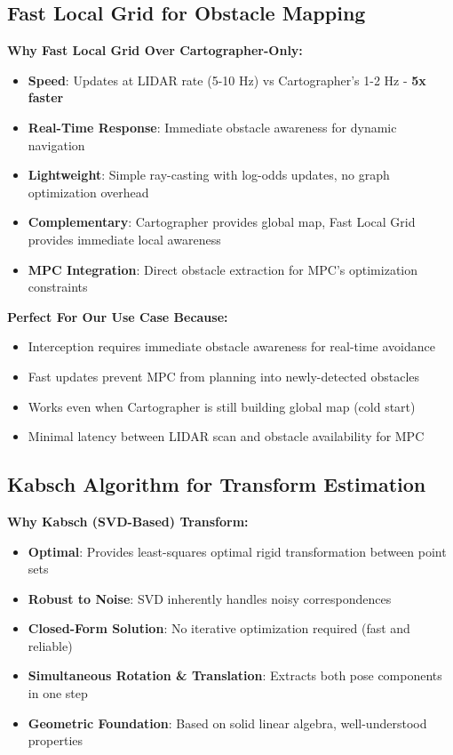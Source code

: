 \documentclass[11pt]{article}
\begin{document}
\subsection{Fast Local Grid for Obstacle Mapping}

\textbf{Why Fast Local Grid Over Cartographer-Only:}

\begin{itemize}
    \item \textbf{Speed}: Updates at LIDAR rate (5-10 Hz) vs Cartographer's 1-2 Hz - \textbf{5x faster}
    \item \textbf{Real-Time Response}: Immediate obstacle awareness for dynamic navigation
    \item \textbf{Lightweight}: Simple ray-casting with log-odds updates, no graph optimization overhead
    \item \textbf{Complementary}: Cartographer provides global map, Fast Local Grid provides immediate local awareness
    \item \textbf{MPC Integration}: Direct obstacle extraction for MPC's optimization constraints
\end{itemize}

\textbf{Perfect For Our Use Case Because:}
\begin{itemize}
    \item Interception requires immediate obstacle awareness for real-time avoidance
    \item Fast updates prevent MPC from planning into newly-detected obstacles
    \item Works even when Cartographer is still building global map (cold start)
    \item Minimal latency between LIDAR scan and obstacle availability for MPC
\end{itemize}

\subsection{Kabsch Algorithm for Transform Estimation}

\textbf{Why Kabsch (SVD-Based) Transform:}

\begin{itemize}
    \item \textbf{Optimal}: Provides least-squares optimal rigid transformation between point sets
    \item \textbf{Robust to Noise}: SVD inherently handles noisy correspondences
    \item \textbf{Closed-Form Solution}: No iterative optimization required (fast and reliable)
    \item \textbf{Simultaneous Rotation \& Translation}: Extracts both pose components in one step
    \item \textbf{Geometric Foundation}: Based on solid linear algebra, well-understood properties
\end{itemize}
\end{document}
